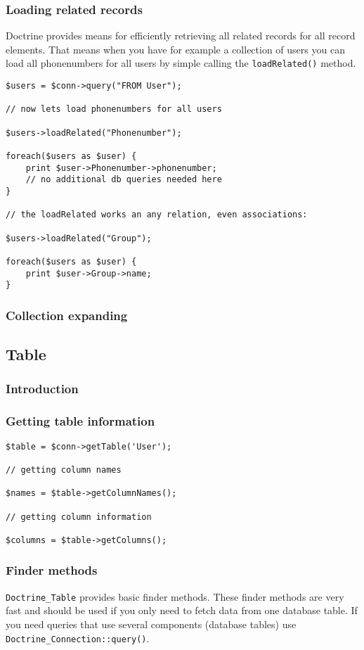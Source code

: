 \documentclass[11pt,a4paper]{report}
\begin{document}
\subsubsection{Loading related records}
Doctrine provides means for efficiently retrieving all related records for all record elements. That means when you have for example a collection of users you can load all phonenumbers for all users by simple calling the \texttt{loadRelated()} method.

\begin{verbatim}
$users = $conn->query("FROM User");

// now lets load phonenumbers for all users

$users->loadRelated("Phonenumber");

foreach($users as $user) {
    print $user->Phonenumber->phonenumber;
    // no additional db queries needed here
}

// the loadRelated works an any relation, even associations:

$users->loadRelated("Group");

foreach($users as $user) {
    print $user->Group->name;
}
\end{verbatim}

\subsubsection{Collection expanding}
\subsection{Table}
\subsubsection{Introduction}
\subsubsection{Getting table information}
\begin{verbatim}
$table = $conn->getTable('User');

// getting column names

$names = $table->getColumnNames();

// getting column information

$columns = $table->getColumns();
\end{verbatim}

\subsubsection{Finder methods}
\texttt{Doctrine\_Table} provides basic finder methods. These finder methods are very fast and should be used if you only need to fetch data from one database table. If you need queries that use several components (database tables) use \texttt{Doctrine\_Connection::query()}.
\end{document}
